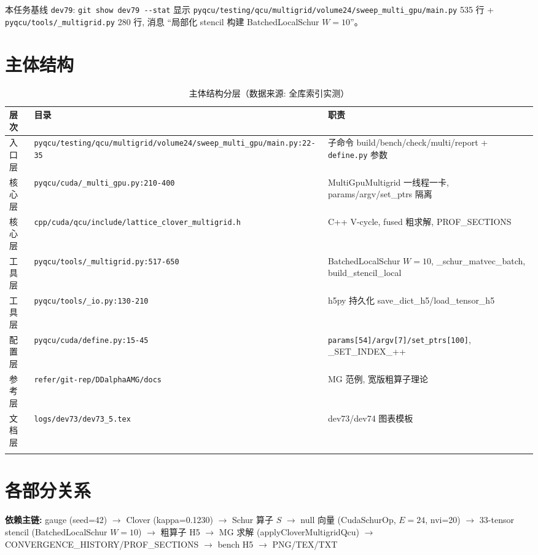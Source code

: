 \documentclass[UTF8]{ctexart}
\begin{document}
\noindent 本任务基线 \texttt{\nolinkurl{dev79}}: \texttt{\nolinkurl{git show dev79 --stat}} 显示 \texttt{\nolinkurl{pyqcu/testing/qcu/multigrid/volume24/sweep_multi_gpu/main.py}} 535 行 + \texttt{\nolinkurl{pyqcu/tools/_multigrid.py}} 280 行, 消息 ``局部化 stencil 构建 BatchedLocalSchur $W=10$''。

\section{主体结构}
\begin{xltabular}{\textwidth}{llX}
\toprule
\textcolor{struct}{层次} & 目录 & \textcolor{struct}{职责} \\
\midrule
\endhead
入口层 & \texttt{\nolinkurl{pyqcu/testing/qcu/multigrid/volume24/sweep_multi_gpu/main.py:22-35}} & 子命令 build/bench/check/multi/report + \texttt{\nolinkurl{define.py}} 参数 \\
核心层 & \texttt{\nolinkurl{pyqcu/cuda/_multi_gpu.py:210-400}} & MultiGpuMultigrid 一线程一卡, params/argv/set\_ptrs 隔离 \\
核心层 & \texttt{\nolinkurl{cpp/cuda/qcu/include/lattice_clover_multigrid.h}} & C++ V-cycle, fused 粗求解, PROF\_SECTIONS \\
工具层 & \texttt{\nolinkurl{pyqcu/tools/_multigrid.py:517-650}} & BatchedLocalSchur $W=10$, \_schur\_matvec\_batch, build\_stencil\_local \\
工具层 & \texttt{\nolinkurl{pyqcu/tools/_io.py:130-210}} & h5py 持久化 save\_dict\_h5/load\_tensor\_h5 \\
配置层 & \texttt{\nolinkurl{pyqcu/cuda/define.py:15-45}} & \texttt{\nolinkurl{params[54]/argv[7]/set_ptrs[100]}}, \_SET\_INDEX\_++ \\
参考层 & \texttt{\nolinkurl{refer/git-rep/DDalphaAMG/docs}} & MG 范例, 宽版粗算子理论 \\
文档层 & \texttt{\nolinkurl{logs/dev73/dev73_5.tex}} & dev73/dev74 图表模板 \\
\bottomrule
\caption{主体结构分层（数据来源: 全库索引实测）}
\end{xltabular}

\section{各部分关系}
\begin{keybox}
\textbf{依赖主链:} \textcolor{relation}{gauge (seed=42) $\to$ Clover (kappa=0.1230) $\to$ Schur 算子 $S$ $\to$ null 向量 (CudaSchurOp, $E=24$, nvi=20) $\to$ 33-tensor stencil (BatchedLocalSchur $W=10$) $\to$ 粗算子 H5 $\to$ MG 求解 (applyCloverMultigridQcu) $\to$ CONVERGENCE\_HISTORY/PROF\_SECTIONS $\to$ bench H5 $\to$ PNG/TEX/TXT}
\end{keybox}
\end{document}
